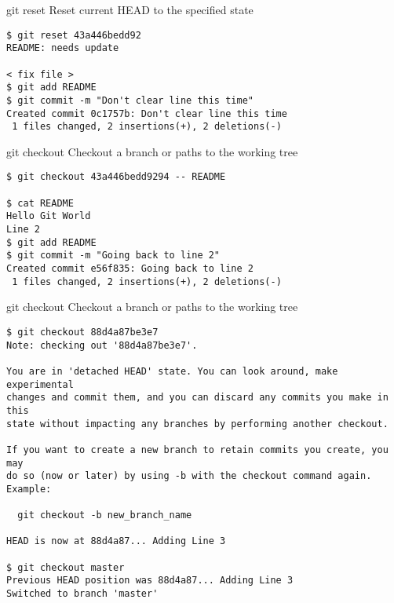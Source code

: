 \begin{frame}[fragile]
\begin{block}{git reset}
Reset current HEAD to the specified state
\end{block}
\begin{verbatim}
$ git reset 43a446bedd92
README: needs update

< fix file >
$ git add README
$ git commit -m "Don't clear line this time"
Created commit 0c1757b: Don't clear line this time
 1 files changed, 2 insertions(+), 2 deletions(-)
\end{verbatim}
\end{frame}

\begin{frame}[fragile]
\begin{block}{git checkout}
Checkout a branch or paths to the working tree
\end{block}
\begin{verbatim}
$ git checkout 43a446bedd9294 -- README

$ cat README
Hello Git World
Line 2
$ git add README
$ git commit -m "Going back to line 2"
Created commit e56f835: Going back to line 2
 1 files changed, 2 insertions(+), 2 deletions(-)
\end{verbatim}
\end{frame}

\begin{frame}[fragile]
\begin{block}{git checkout}
Checkout a branch or paths to the working tree
\end{block}
\tiny
\begin{verbatim}
$ git checkout 88d4a87be3e7
Note: checking out '88d4a87be3e7'.

You are in 'detached HEAD' state. You can look around, make experimental
changes and commit them, and you can discard any commits you make in this
state without impacting any branches by performing another checkout.

If you want to create a new branch to retain commits you create, you may
do so (now or later) by using -b with the checkout command again. Example:

  git checkout -b new_branch_name

HEAD is now at 88d4a87... Adding Line 3

$ git checkout master
Previous HEAD position was 88d4a87... Adding Line 3
Switched to branch 'master'
\end{verbatim}
\end{frame}
